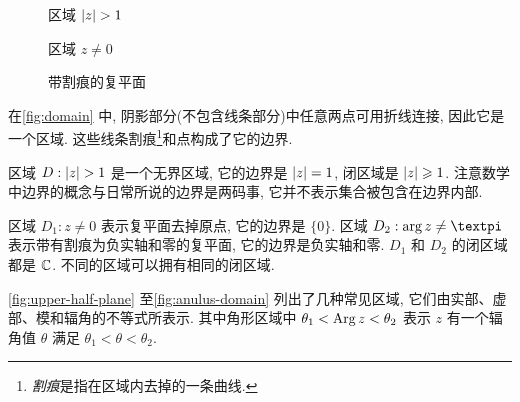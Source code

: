 \begin{figure}[H]
  \centering
  \begin{minipage}{.32\textwidth}
    \centering
    \caption{区域 $\lvert z\rvert>1$\footnotemark}
  \end{minipage}
  \begin{minipage}{.32\textwidth}
    \centering
    \caption{区域 $z\neq0$}
  \end{minipage}
  \begin{minipage}{.32\textwidth}
    \centering
    \caption{带割痕的复平面}
  \end{minipage}
\end{figure}

\begin{exampleenum}
  \item 在\ref{fig:domain} 中, 阴影部分(不包含线条部分)中任意两点可用折线连接, 因此它是一个区域.
  这些线条割痕\footnote{\emph{割痕}是指在区域内去掉的一条曲线.}和点构成了它的边界.
  \item 区域 $D:\lvert z\rvert>1$ 是一个无界区域, 它的边界是 $\lvert z\rvert=1$, 闭区域是 $\lvert z\rvert\geqslant 1$.
  注意数学中边界的概念与日常所说的边界是两码事, 它并不表示集合被包含在边界内部. 
  \item 区域 $D_1:z\neq 0$ 表示复平面去掉原点, 它的边界是 $\{0\}$.
  区域 $D_2: \arg z\neq\cpi$ 表示带有割痕为负实轴和零的复平面, 它的边界是负实轴和零.
  $D_1$ 和 $D_2$ 的闭区域都是 ${\mathbb{C}}$.
  不同的区域可以拥有相同的闭区域.
  \item \ref{fig:upper-half-plane} 至\ref{fig:anulus-domain} 列出了几种常见区域, 它们由实部、虚部、模和辐角的不等式所表示.
  其中角形区域中 $\theta_1<\operatorname{Arg} z<\theta_2$ 表示 $z$ 有一个辐角值 $\theta$ 满足 $\theta_1<\theta<\theta_2$.
\end{exampleenum}


